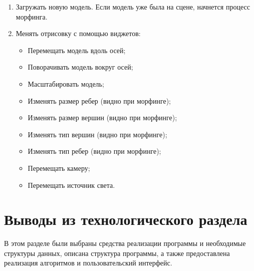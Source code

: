 \begin{enumerate}
	\item Загружать новую модель.
	Если модель уже была на сцене, начнется процесс морфинга.
	\item Менять отрисовку с помощью виджетов:
	
	\begin{itemize}
		\item Перемещать модель вдоль осей;
		\item Поворачивать модель вокруг осей;
		\item Масштабировать модель;
		\item Изменять размер ребер (видно при морфинге);
		\item Изменять размер вершин (видно при морфинге);
		\item Изменять тип вершин (видно при морфинге);
		\item Изменять тип ребер (видно при морфинге);
		\item Перемещать камеру;
		\item Перемещать источник света.
	\end{itemize}
\end{enumerate}



\section*{Выводы из технологического раздела}

В этом разделе были выбраны средства реализации программы и необходимые структуры данных, описана структура программы, а также предоставлена реализация алгоритмов и пользовательский интерфейс.

